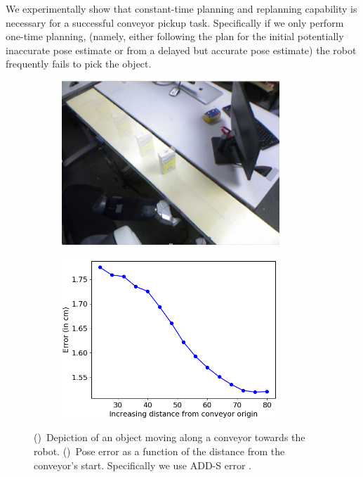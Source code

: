 \documentclass[conference]{IEEEtran}
\begin{document}
%
We experimentally show that constant-time planning and replanning capability is necessary for a successful conveyor pickup task. Specifically if we only perform one-time planning, (namely, either following the plan for the initial potentially inaccurate pose estimate or from a delayed but accurate pose estimate) the robot frequently fails to pick the object.
\begin{figure}[t]
    \centering
    \begin{subfigure}{.225\textwidth}
        \includegraphics[width=0.9\textwidth]{object_blur}
        \caption{}
        \label{fig:obj1}
    \end{subfigure}
    \begin{subfigure}{0.225\textwidth}
        \includegraphics[width=0.9\textwidth]{pose_error_f}
        \caption{}
        \label{fig:obj2}
    \end{subfigure}
    \caption{
    \CaptionTextSize
    ()~Depiction of an object moving along a conveyor towards the robot.
    ()~Pose error as a function of the distance from the conveyor's start. Specifically we use ADD-S error \cite{add_metric}.
    }
    \label{fig:pose_sequence}
\end{figure}
\end{document}
